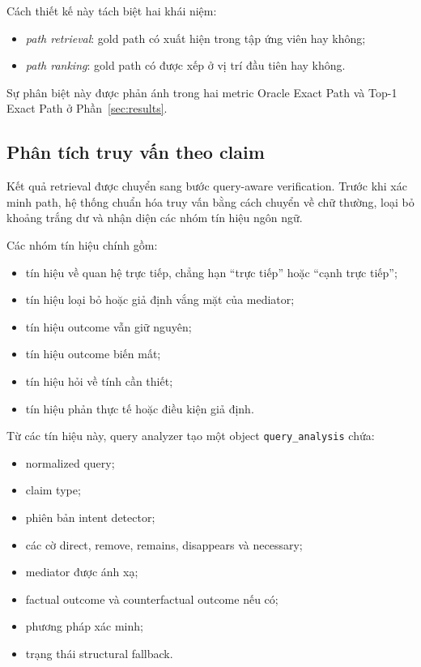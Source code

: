 Cách thiết kế này tách biệt hai khái niệm:

\begin{itemize}
    \item \emph{path retrieval}: gold path có xuất hiện trong tập ứng viên
    hay không;

    \item \emph{path ranking}: gold path có được xếp ở vị trí đầu tiên hay
    không.
\end{itemize}

Sự phân biệt này được phản ánh trong hai metric Oracle Exact Path và Top-1
Exact Path ở Phần~\ref{sec:results}.

\subsection{Phân tích truy vấn theo claim}

Kết quả retrieval được chuyển sang bước query-aware verification. Trước khi
xác minh path, hệ thống chuẩn hóa truy vấn bằng cách chuyển về chữ thường,
loại bỏ khoảng trắng dư và nhận diện các nhóm tín hiệu ngôn ngữ.

Các nhóm tín hiệu chính gồm:

\begin{itemize}
    \item tín hiệu về quan hệ trực tiếp, chẳng hạn ``trực tiếp'' hoặc
    ``cạnh trực tiếp'';

    \item tín hiệu loại bỏ hoặc giả định vắng mặt của mediator;

    \item tín hiệu outcome vẫn giữ nguyên;

    \item tín hiệu outcome biến mất;

    \item tín hiệu hỏi về tính cần thiết;

    \item tín hiệu phản thực tế hoặc điều kiện giả định.
\end{itemize}

Từ các tín hiệu này, query analyzer tạo một object
\texttt{query\_analysis} chứa:

\begin{itemize}
    \item normalized query;
    \item claim type;
    \item phiên bản intent detector;
    \item các cờ direct, remove, remains, disappears và necessary;
    \item mediator được ánh xạ;
    \item factual outcome và counterfactual outcome nếu có;
    \item phương pháp xác minh;
    \item trạng thái structural fallback.
\end{itemize}

